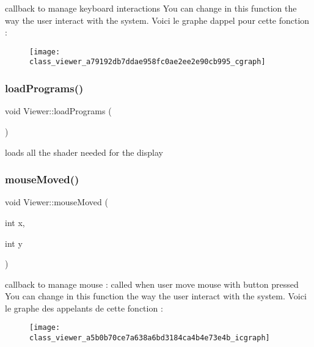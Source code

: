 callback to manage keyboard interactions You can change in this function the way the user interact with the system. Voici le graphe d\textquotesingle{}appel pour cette fonction \+:\nopagebreak
\begin{figure}[H]
\begin{center}
\leavevmode
\texttt{[image: class\_viewer\_a79192db7ddae958fc0ae2ee2e90cb995\_cgraph]}
\end{center}
\end{figure}
\mbox{\label{class_viewer_a7afbf6081ffc5d44f4939b0d579d0b58}} 
\subsubsection{\texorpdfstring{load\+Programs()}{loadPrograms()}}
{\footnotesize\ttfamily void Viewer\+::load\+Programs (\begin{DoxyParamCaption}{ }\end{DoxyParamCaption})}



loads all the shader needed for the display 

\mbox{\label{class_viewer_a5b0b70ce7a638a6bd3184ca4b4e73e4b}} 
\subsubsection{\texorpdfstring{mouse\+Moved()}{mouseMoved()}}
{\footnotesize\ttfamily void Viewer\+::mouse\+Moved (\begin{DoxyParamCaption}\item[{int}]{x,  }\item[{int}]{y }\end{DoxyParamCaption})}

callback to manage mouse \+: called when user move mouse with button pressed You can change in this function the way the user interact with the system. Voici le graphe des appelants de cette fonction \+:\nopagebreak
\begin{figure}[H]
\begin{center}
\leavevmode
\texttt{[image: class\_viewer\_a5b0b70ce7a638a6bd3184ca4b4e73e4b\_icgraph]}
\end{center}
\end{figure}
\mbox{\label{class_viewer_ac2e3964b994ed24680586369b2b7a750}} 
